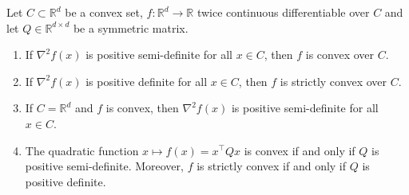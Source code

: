 \documentclass[12pt,openany]{book}
\theoremstyle{definition}
\theoremstyle{definition}
\newcommand{\R}{\mathbb{R}}
\begin{document}
\begin{prop}
Let $C\subset\R^d$ be a convex set, $f:\R^d\to \R$ twice continuous differentiable over $C$ and let $Q\in\R^{d\times d}$ be a symmetric matrix. 
\begin{enumerate}
\item If $\nabla^2 f(x)$ is positive semi-definite for all $x\in C$, then $f$ is convex over $C$.
\item If $\nabla^2 f(x)$ is positive definite for all $x\in C$, then $f$ is strictly convex over $C$.
\item If $C=\R^d$ and $f$ is convex, then $\nabla^2 f(x)$ is positive semi-definite for all $x\in C$.
\item The quadratic function $x\mapsto f(x) = x^\top Q x$ is convex if and only if $Q$ is positive semi-definite. Moreover, $f$ is strictly convex if and only if $Q$ is positive definite.  
\end{enumerate}
\end{prop}
\end{document}
